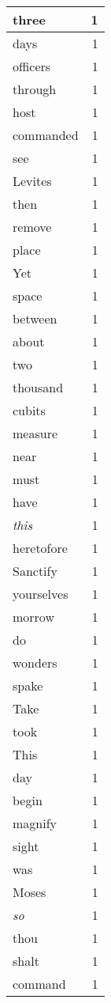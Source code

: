 \begin{center}
\begin{longtable}{l|r}
three & 1 \\ \hline
days & 1 \\ \hline
officers & 1 \\ \hline
through & 1 \\ \hline
host & 1 \\ \hline
commanded & 1 \\ \hline
see & 1 \\ \hline
Levites & 1 \\ \hline
then & 1 \\ \hline
remove & 1 \\ \hline
place & 1 \\ \hline
Yet & 1 \\ \hline
space & 1 \\ \hline
between & 1 \\ \hline
about & 1 \\ \hline
two & 1 \\ \hline
thousand & 1 \\ \hline
cubits & 1 \\ \hline
measure & 1 \\ \hline
near & 1 \\ \hline
must & 1 \\ \hline
have & 1 \\ \hline
\emph{this} & 1 \\ \hline
heretofore & 1 \\ \hline
Sanctify & 1 \\ \hline
yourselves & 1 \\ \hline
morrow & 1 \\ \hline
do & 1 \\ \hline
wonders & 1 \\ \hline
spake & 1 \\ \hline
Take & 1 \\ \hline
took & 1 \\ \hline
This & 1 \\ \hline
day & 1 \\ \hline
begin & 1 \\ \hline
magnify & 1 \\ \hline
sight & 1 \\ \hline
was & 1 \\ \hline
Moses & 1 \\ \hline
\emph{so} & 1 \\ \hline
thou & 1 \\ \hline
shalt & 1 \\ \hline
command & 1 \\ \hline

\end{longtable}
\end{center}
